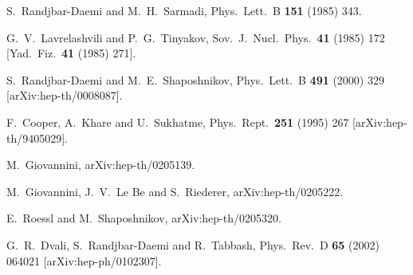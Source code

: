 \documentclass[a4paper,12pt]{article}
\begin{document}
\begin{thebibliography}{99}
S.~Randjbar-Daemi and M.~H.~Sarmadi,
Phys.\ Lett.\ B {\bf 151} (1985) 343.

G.~V.~Lavrelashvili and P.~G.~Tinyakov,
Sov.\ J.\ Nucl.\ Phys.\  {\bf 41} (1985) 172
[Yad.\ Fiz.\  {\bf 41} (1985) 271].

S.~Randjbar-Daemi and M.~E.~Shaposhnikov,
Phys.\ Lett.\ B {\bf 491} (2000) 329
[arXiv:hep-th/0008087].

F.~Cooper, A.~Khare and U.~Sukhatme,
Phys.\ Rept.\  {\bf 251} (1995) 267
[arXiv:hep-th/9405029].

M.~Giovannini,
arXiv:hep-th/0205139.

M.~Giovannini, J.~V.~Le Be and S.~Riederer,
arXiv:hep-th/0205222.

E.~Roessl and M.~Shaposhnikov,
arXiv:hep-th/0205320.

G.~R.~Dvali, S.~Randjbar-Daemi and R.~Tabbash,
Phys.\ Rev.\ D {\bf 65} (2002) 064021
[arXiv:hep-ph/0102307].

\end{thebibliography}
\end{document}
